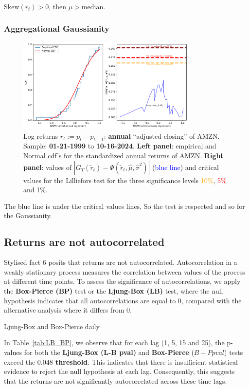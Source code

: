 \documentclass{article}
\begin{document}
\( \text{Skew}(r_t) > 0 \), then \( \mu > \text{median} \).

\subsubsection{Aggregational Gaussianity}
\begin{figure}[H]
    \centering
    \includegraphics[width=0.8\textwidth]{Img/lillie_test_AMZNannualy.pdf}
    \caption{Log returns $r_t := p_t - p_{t-1}$: \textbf{annual} “adjusted closing” of AMZN. 
    Sample: \textbf{01-21-1999} to \textbf{10-16-2024}. \textbf{Left panel}: empirical and Normal cdf's for the standardized annual returns of AMZN. \textbf{Right panel}: values of $\left| G_T(\tilde{r}_t) - \Phi(\tilde{r}_t, \hat{\mu}, \hat{\sigma}^2) \right|$ (\textcolor{blue}{blue line}) and critical values for the Lilliefors test for the three significance levels \textcolor{orange}{10\%}, \textcolor{red}{5\%} and \textcolor{darkbrown}{1\%}.}
    \label{fig:Lillie_test_weekly}
\end{figure}

\noindent The blue line is under the critical values lines, 
So the test is respected and so for the Gaussianity.
\subsection{Returns are not autocorrelated}

Stylised fact 6 posits that returns are not autocorrelated. 
Autocorrelation in a weakly stationary process measures the correlation between values of the process at different time points. 
To assess the significance of autocorrelations, we apply the \textbf{Box-Pierce (BP)} test or the \textbf{Ljung-Box (LB)} test, 
where the null hypothesis indicates that all autocorrelations are equal to 0, compared with the alternative analysis where it differs from 0.

\begin{table}[H]

    \centering
      
    \caption{Ljung-Box and Box-Pierce daily}
    \label{tab:LB_BP}
\end{table}
In Table~\ref{tab:LB_BP}, we observe that for each lag (1, 5, 15 and 25), the p-values for both the \textbf{Ljung-Box (L-B pval)} and \textbf{Box-Pierce} ($B-P pval$) tests exceed the \textbf{$0.048$ threshold}. This indicates that there is insufficient statistical evidence to reject the null hypothesis at each lag. Consequently, this suggests that the returns are not significantly autocorrelated across these time lags.
\end{document}
